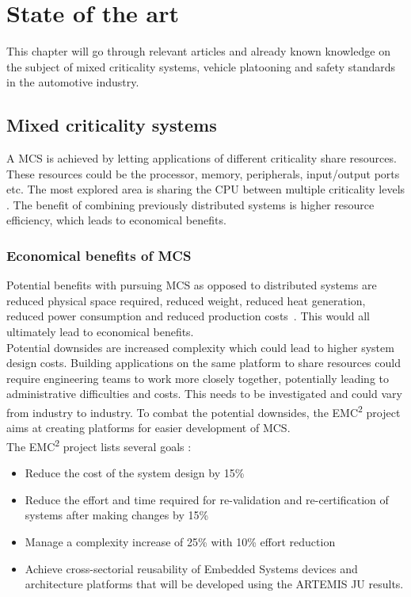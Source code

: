 \chapter{State of the art}
This chapter will go through relevant articles and already known knowledge on the subject of mixed criticality systems, vehicle platooning and safety standards in the automotive industry.

\section{Mixed criticality systems}
A MCS is achieved by letting applications of different criticality share resources. These resources could be the processor, memory, peripherals, input/output ports etc. The most explored area is sharing the CPU between multiple criticality levels \cite{burns2016}. The benefit of combining previously distributed systems is higher resource efficiency, which leads to economical benefits.


\subsection{Economical benefits of MCS}
Potential benefits with pursuing MCS as opposed to distributed systems are reduced physical space required, reduced weight, reduced heat generation, reduced power consumption and reduced production costs~\cite{burns2016}. This would all ultimately lead to economical benefits.\\

Potential downsides are increased complexity which could lead to higher system design costs. Building applications on the same platform to share resources could require engineering teams to work more closely together, potentially leading to administrative difficulties and costs. This needs to be investigated and could vary from industry to industry. To combat the potential downsides, the EMC\textsuperscript{2} project aims at creating platforms for easier development of MCS.\\ %

The EMC\textsuperscript{2} project lists several goals \cite{website:emc2goals}:
\begin{itemize}
\item Reduce the cost of the system design by 15\%
\item Reduce the effort and time required for re-validation and re-certification of systems after making changes by 15\%
\item Manage a complexity increase of 25\% with 10\% effort reduction
\item Achieve cross-sectorial reusability of Embedded Systems devices and architecture platforms that will be developed using the ARTEMIS JU results.
\end{itemize}

